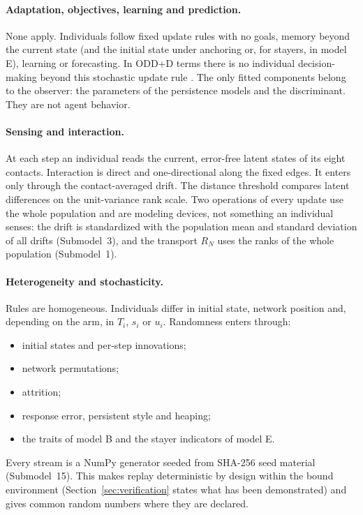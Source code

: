 \paragraph{Adaptation, objectives, learning and prediction.}
None apply. Individuals follow fixed update rules with no goals, memory beyond the current state (and the initial state under anchoring or, for stayers, in model E), learning or forecasting. In ODD+D terms there is no individual decision-making beyond this stochastic update rule \cite{muller2013oddd}. The only fitted components belong to the observer: the parameters of the persistence models and the discriminant. They are not agent behavior.

\paragraph{Sensing and interaction.}
At each step an individual reads the current, error-free latent states of its eight contacts. Interaction is direct and one-directional along the fixed edges. It enters only through the contact-averaged drift. The distance threshold compares latent differences on the unit-variance rank scale. Two operations of every update use the whole population and are modeling devices, not something an individual senses: the drift is standardized with the population mean and standard deviation of all drifts (Submodel~3), and the transport $R_N$ uses the ranks of the whole population (Submodel~1).

\paragraph{Heterogeneity and stochasticity.}
Rules are homogeneous. Individuals differ in initial state, network position and, depending on the arm, in $T_i$, $s_i$ or $u_i$. Randomness enters through:
\begin{itemize}
\item initial states and per-step innovations;
\item network permutations;
\item attrition;
\item response error, persistent style and heaping;
\item the traits of model B and the stayer indicators of model E.
\end{itemize}
Every stream is a NumPy  generator seeded from SHA-256 seed material (Submodel~15). This makes replay deterministic by design within the bound environment (Section~\ref{sec:verification} states what has been demonstrated) and gives common random numbers where they are declared.

